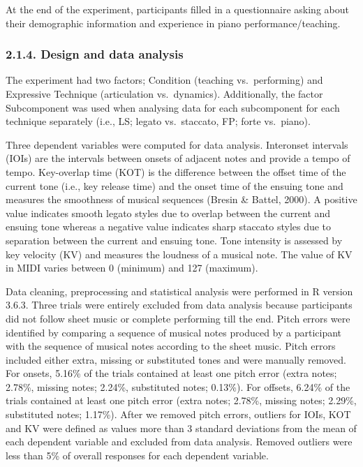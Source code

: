 \documentclass[
  english,
  man,floatsintext]{apa6}
\begin{document}
At the end of the experiment, participants filled in a questionnaire asking about their demographic information and experience in piano performance/teaching.

\hypertarget{design-and-data-analysis}{%
\subsubsection{2.1.4. Design and data analysis}\label{design-and-data-analysis}}

The experiment had two factors; Condition (teaching vs.~performing) and Expressive Technique (articulation vs.~dynamics). Additionally, the factor Subcomponent was used when analysing data for each subcomponent for each technique separately (i.e., LS; legato vs.~staccato, FP; forte vs.~piano).

Three dependent variables were computed for data analysis. Interonset intervals (IOIs) are the intervals between onsets of adjacent notes and provide a tempo of tempo. Key-overlap time (KOT) is the difference between the offset time of the current tone (i.e., key release time) and the onset time of the ensuing tone and measures the smoothness of musical sequences (Bresin \& Battel, 2000). A positive value indicates smooth legato styles due to overlap between the current and ensuing tone whereas a negative value indicates sharp staccato styles due to separation between the current and ensuing tone. Tone intensity is assessed by key velocity (KV) and measures the loudness of a musical note. The value of KV in MIDI varies between 0 (minimum) and 127 (maximum).

Data cleaning, preprocessing and statistical analysis were performed in R version 3.6.3. Three trials were entirely excluded from data analysis because participants did not follow sheet music or complete performing till the end. Pitch errors were identified by comparing a sequence of musical notes produced by a participant with the sequence of musical notes according to the sheet music. Pitch errors included either extra, missing or substituted tones and were manually removed. For onsets, 5.16\% of the trials contained at least one pitch error (extra notes; 2.78\%, missing notes; 2.24\%, substituted notes; 0.13\%). For offsets, 6.24\% of the trials contained at least one pitch error (extra notes; 2.78\%, missing notes; 2.29\%, substituted notes; 1.17\%). After we removed pitch errors, outliers for IOIs, KOT and KV were defined as values more than 3 standard deviations from the mean of each dependent variable and excluded from data analysis. Removed outliers were less than 5\% of overall responses for each dependent variable.
\end{document}
